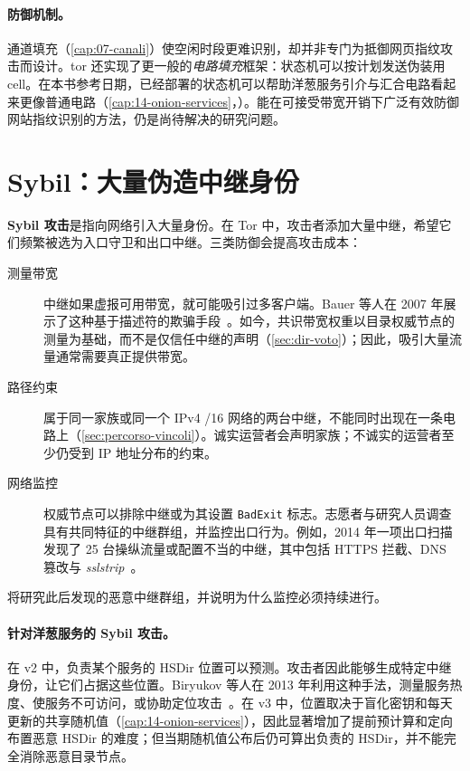 \paragraph{防御机制。}通道填充（\cref{cap:07-canali}）使空闲时段更难识别，却并非专门为抵御网页指纹攻击而设计。tor 还实现了更一般的\emph{电路填充}框架：状态机可以按计划发送伪装用 cell。在本书参考日期，已经部署的状态机可以帮助洋葱服务引介与汇合电路看起来更像普通电路（\cref{cap:14-onion-services}，）。能在可接受带宽开销下广泛有效防御网站指纹识别的方法，仍是尚待解决的研究问题。

\section{Sybil：大量伪造中继身份}\label{sec:att-sybil}

\textbf{Sybil 攻击}是指向网络引入大量身份。在 Tor 中，攻击者添加大量中继，希望它们频繁被选为入口守卫和出口中继。三类防御会提高攻击成本：
\begin{description}
  \item[测量带宽] 中继如果虚报可用带宽，就可能吸引过多客户端。Bauer 等人在 2007 年展示了这种基于描述符的欺骗手段~\cite{bauer2007lowresource}。如今，共识带宽权重以目录权威节点的测量为基础，而不是仅信任中继的声明（\cref{sec:dir-voto}）；因此，吸引大量流量通常需要真正提供带宽。
  \item[路径约束] 属于同一家族或同一个 IPv4 /16 网络的两台中继，不能同时出现在一条电路上（\cref{sec:percorso-vincoli}）。诚实运营者会声明家族；不诚实的运营者至少仍受到 IP 地址分布的约束。
  \item[网络监控] 权威节点可以排除中继或为其设置 \texttt{BadExit} 标志。志愿者与研究人员调查具有共同特征的中继群组，并监控出口行为。例如，2014 年一项出口扫描发现了 25 台操纵流量或配置不当的中继，其中包括 HTTPS 拦截、DNS 篡改与 \emph{sslstrip}~\cite{winter2014spoiled}。
\end{description}
 将研究此后发现的恶意中继群组，并说明为什么监控必须持续进行。

\paragraph{针对洋葱服务的 Sybil 攻击。}在 v2 中，负责某个服务的 HSDir 位置可以预测。攻击者因此能够生成特定中继身份，让它们占据这些位置。Biryukov 等人在 2013 年利用这种手法，测量服务热度、使服务不可访问，或协助定位攻击~\cite{biryukov2013trawling}。在 v3 中，位置取决于盲化密钥和每天更新的共享随机值（\cref{cap:14-onion-services}），因此显著增加了提前预计算和定向布置恶意 HSDir 的难度；但当期随机值公布后仍可算出负责的 HSDir，并不能完全消除恶意目录节点。

